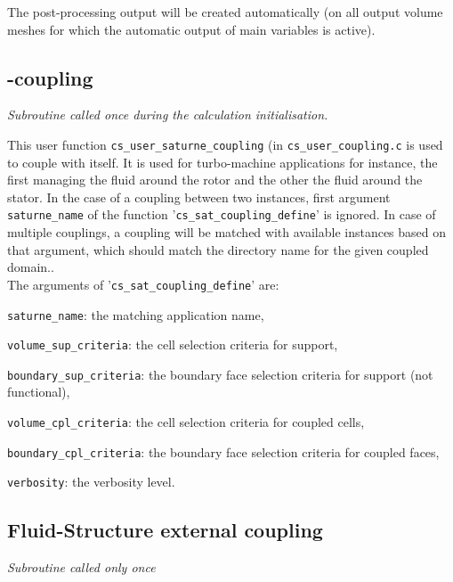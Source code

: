 {{The post-processing output will be created automatically (on all output volume
meshes for which the automatic output of main variables is active).

\subsection{\CS-\CS coupling}

\noindent
\textit{Subroutine called once during the calculation initialisation.}

This user function \texttt{cs\_user\_saturne\_coupling} (in
 \texttt{cs\_user\_coupling.c} is used to couple \CS with itself.
 It is used for turbo-machine applications for instance, the first \CS managing
 the fluid around the rotor and the other the fluid around the stator.
In the case of a coupling between two \CS instances, first argument \texttt{saturne\_name}
 of the function '\texttt{cs\_sat\_coupling\_define}' is ignored.
 In case of multiple couplings, a coupling will be matched with available \CS
 instances based on that argument, which should match the directory name for the
 given coupled domain..\\
The arguments of '\texttt{cs\_sat\_coupling\_define}' are:
\begin{list}{-}{}
\item \texttt{saturne\_name}: the matching \CS application name,
\item \texttt{volume\_sup\_criteria}: the cell selection criteria for support,
\item \texttt{boundary\_sup\_criteria}: the boundary face selection criteria for support (not functional),
\item \texttt{volume\_cpl\_criteria}: the cell selection criteria for coupled cells,
\item \texttt{boundary\_cpl\_criteria}: the boundary face selection criteria for coupled faces,
\item \texttt{verbosity}: the verbosity level.
\end{list}


\subsection{Fluid-Structure external coupling}

\noindent
\textit{Subroutine called only once}

}}
